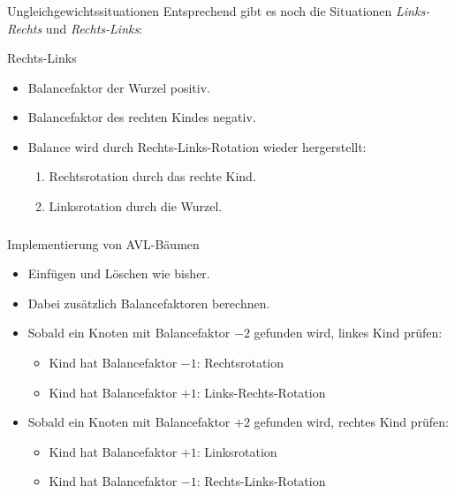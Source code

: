 \begin{frame}
\frametitle{\insertsection}
\begin{block}
{Ungleichgewichtssituationen}
Entsprechend gibt es noch die Situationen \emph{Links-Rechts} und \emph{Rechts-Links}:
\end{block}

\begin{block}
{Rechts-Links}
\begin{itemize}
	\item Balancefaktor der Wurzel positiv.
	\item Balancefaktor des rechten Kindes negativ.
	\item Balance wird durch \alert{Rechts-Links-Rotation} wieder hergerstellt:
	\begin{enumerate}
		\item Rechtsrotation durch das rechte Kind.
		\item Linksrotation durch die Wurzel.
	\end{enumerate}
\end{itemize}
\end{block}
\end{frame}

\begin{frame}
\frametitle{\insertsection}
\begin{block}
{Implementierung von AVL-Bäumen}
\begin{itemize}
	\item Einfügen und Löschen wie bisher.
	\item Dabei zusätzlich Balancefaktoren berechnen.
	\item<3-> Sobald ein Knoten mit Balancefaktor $-2$ gefunden wird, linkes Kind prüfen:
	\begin{itemize}
		\item Kind hat Balancefaktor $-1$: Rechtsrotation
		\item Kind hat Balancefaktor $+1$: Links-Rechts-Rotation
	\end{itemize}
	\item<4-> Sobald ein Knoten mit Balancefaktor $+2$ gefunden wird, rechtes Kind prüfen:
	\begin{itemize}
		\item Kind hat Balancefaktor $+1$: Linksrotation
		\item Kind hat Balancefaktor $-1$: Rechts-Links-Rotation
	\end{itemize}
\end{itemize}
\end{block}
\end{frame}
